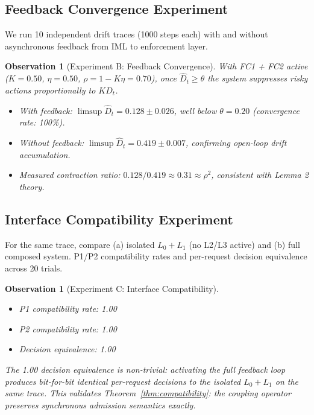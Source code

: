 \documentclass[11pt]{article}
\newtheorem{observation}[theorem]{Observation}
\newcommand{\Dhat}{\widehat{D}}
\newcommand{\Layer}[1]{L_{#1}}
\begin{document}
\subsection{Feedback Convergence Experiment}

We run 10 independent drift traces (1000 steps each) with and without asynchronous feedback from IML to enforcement layer.

\begin{observation}[Experiment B: Feedback Convergence]
\label{obs:exp-feedback}
With FC1 + FC2 active ($K=0.50$, $\eta=0.50$, $\rho=1-K\eta=0.70$), once $\Dhat_t \geq \theta$ the system suppresses risky actions proportionally to $K\Dhat_t$.

\begin{itemize}[noitemsep]
  \item With feedback: $\limsup \Dhat_t = 0.128 \pm 0.026$, well below $\theta = 0.20$ (convergence rate: 100\%).
  \item Without feedback: $\limsup \Dhat_t = 0.419 \pm 0.007$, confirming open-loop drift accumulation.
  \item Measured contraction ratio: $0.128/0.419 \approx 0.31 \approx \rho^2$, consistent with Lemma 2 theory.
\end{itemize}
\end{observation}

\subsection{Interface Compatibility Experiment}

For the same trace, compare (a) isolated $\Layer{0}+\Layer{1}$ (no L2/L3 active) and (b) full composed system. P1/P2 compatibility rates and per-request decision equivalence across 20 trials.

\begin{observation}[Experiment C: Interface Compatibility]
\label{obs:exp-compat}
\begin{itemize}[noitemsep]
  \item P1 compatibility rate: 1.00
  \item P2 compatibility rate: 1.00
  \item Decision equivalence: 1.00
\end{itemize}
The 1.00 decision equivalence is non-trivial: activating the full feedback loop produces bit-for-bit identical per-request decisions to the isolated $\Layer{0}+\Layer{1}$ on the same trace. This validates Theorem~\ref{thm:compatibility}: the coupling operator preserves synchronous admission semantics exactly.
\end{observation}
\end{document}
